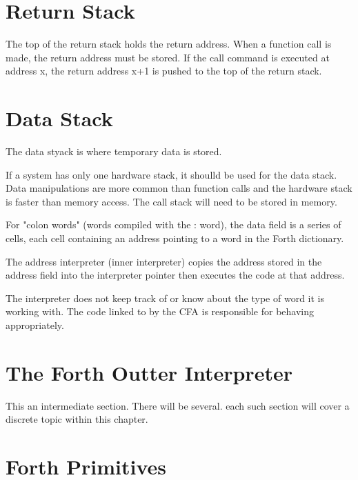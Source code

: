 \section{Return Stack}
The top of the return stack holds the return address. When a function call is made, the return address
must be stored.  If the call command is executed at address x, the return address x+1 is pushed to the top of the return stack.

\section{Data Stack}
The data styack is where temporary data is stored.

If a system has only one hardware stack, it shoulld be used for the data stack. Data 
manipulations are more common than function calls and the hardware stack is faster 
than memory access. The call stack will need to be stored in memory.

For "colon words" (words compiled with the : word), the data field is a series of cells, each cell
containing an address pointing to a word in the Forth dictionary.

The address interpreter (inner interpreter) copies the address stored in the address field
into the interpreter pointer then executes the code at that address.

The interpreter does not keep track of or know about the type of word it is working with. The code linked to by the CFA is responsible for behaving appropriately.

%
\section{The Forth Outter Interpreter}
This an intermediate section. There will be several. each such section will cover a
discrete topic within this chapter.


\blindtext

%
\section{Forth Primitives}


